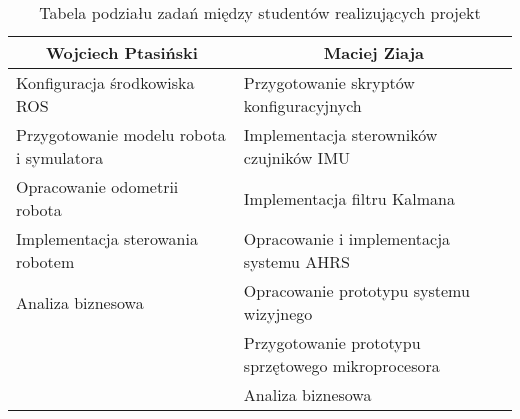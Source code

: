 \begin{table}[h]
\begin{tabular}{ll}
\toprule
\multicolumn{1}{c}{Wojciech Ptasiński}   & \multicolumn{1}{c}{Maciej Ziaja} \\
\midrule
Konfiguracja środkowiska ROS             & Przygotowanie skryptów
                                           konfiguracyjnych \\
Przygotowanie modelu robota i symulatora & Implementacja sterowników czujników
                                           IMU \\
Opracowanie odometrii robota             & Implementacja filtru Kalmana \\
Implementacja sterowania robotem         & Opracowanie i implementacja systemu
                                           AHRS \\
Analiza biznesowa                        & Opracowanie prototypu systemu
                                           wizyjnego \\
                                         & Przygotowanie prototypu sprzętowego
                                           mikroprocesora \\
                                         & Analiza biznesowa \\
\bottomrule
\end{tabular}
\caption{Tabela podziału zadań między studentów realizujących projekt}
\label{tab:org}
\end{table}